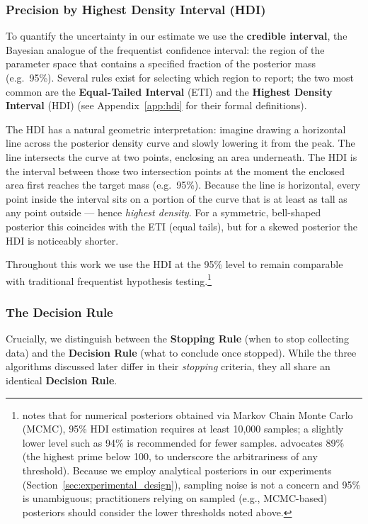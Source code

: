 \subsubsection{Precision by Highest Density Interval (HDI)}\label{sec:precision_hdi}

To quantify the uncertainty in our estimate we use the \textbf{credible interval},
the Bayesian analogue of the frequentist confidence interval:
the region of the parameter space that contains a specified fraction of the posterior mass
(e.g.\ 95\%).
Several rules exist for selecting which region to report; the two most common are the
\textbf{Equal-Tailed Interval} (ETI) and the \textbf{Highest Density Interval} (HDI)
(see Appendix~\ref{app:hdi} for their formal definitions).

The HDI has a natural geometric interpretation: imagine drawing a horizontal line across
the posterior density curve and slowly lowering it from the peak. The line intersects the
curve at two points, enclosing an area underneath. The HDI is the interval between those
two intersection points at the moment the enclosed area first reaches the target mass
(e.g.\ 95\%). Because the line is horizontal, every point inside the interval sits on a
portion of the curve that is at least as tall as any point outside — hence \textit{highest
density}. For a symmetric, bell-shaped posterior this coincides with the ETI (equal tails),
but for a skewed posterior the HDI is noticeably shorter.

Throughout this work we use the HDI at the 95\% level to remain comparable with traditional
frequentist hypothesis testing.\footnote{\cite{kruschke2015doing} notes that for numerical posteriors
obtained via Markov Chain Monte Carlo (MCMC), 95\% HDI estimation requires at least 10{,}000 samples; a slightly lower
level such as 94\% is recommended for fewer samples. \cite{mcelreath2016} advocates 89\%
(the highest prime below 100, to underscore the arbitrariness of any threshold). Because we employ analytical
posteriors in our experiments (Section~\ref{sec:experimental_design}), sampling noise is not a
concern and 95\% is unambiguous; practitioners relying on sampled (e.g., MCMC-based) posteriors
should consider the lower thresholds noted above.}

\subsubsection{The Decision Rule}\label{sec:decision_criterion}

Crucially, we distinguish between the \textbf{Stopping Rule} (when to stop collecting data)
and the \textbf{Decision Rule} (what to conclude once stopped). While the three algorithms
discussed later differ in their \textit{stopping} criteria, they all share an identical
\textbf{Decision Rule}.

